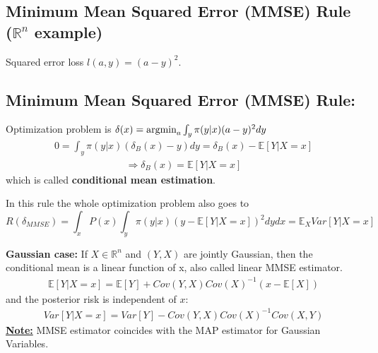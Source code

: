 \documentclass[11pt]{elegantbook}
\newcommand{\argmin}{\operatornamewithlimits{argmin}}
\begin{document}
\subsection{Minimum Mean Squared Error (MMSE) Rule ($\mathbb{R}^n$ example)}
\begin{example}[ (Estimation)]
    Squared error loss $l(a,y)=(a-y)^2$.
\end{example}
\subsection*{Minimum Mean Squared Error (MMSE) Rule:}
Optimization problem is $\delta(x)=\argmin_{a} \int_{y} \pi(y|x) (a-y)^2 dy$
\begin{equation}
    \begin{aligned}
        0=\int_{y} \pi(y|x) (\delta_B(x)-y) dy=\delta_B(x)-\mathbb{E}\left[Y|X=x\right]
    \end{aligned}
    \nonumber
\end{equation}
\begin{equation}
    \begin{aligned}
        \Rightarrow \delta_B(x)=\mathbb{E}\left[Y|X=x\right]
    \end{aligned}
    \nonumber
\end{equation}
which is called \textbf{conditional mean estimation}.

In this rule the whole optimization problem also goes to
$$R(\delta_{MMSE})=\int_x P(x)\int_y \pi(y|x) (y-\mathbb{E}\left[Y|X=x\right])^2 dy dx=\mathbb{E}_X Var\left[Y|X=x\right]$$

\textbf{Gaussian case:}
If $X\in \mathbb{R}^n$ and $(Y,X)$ are jointly Gaussian, then the conditional mean is a linear function of x, also called linear MMSE estimator.
\begin{equation}
    \begin{aligned}
        \mathbb{E}\left[Y|X=x\right]=\mathbb{E}[Y]+Cov(Y,X)Cov(X)^{-1}(x-\mathbb{E}[X])
    \end{aligned}
    \nonumber
\end{equation}
and the posterior risk is independent of $x$:
\begin{equation}
    \begin{aligned}
        Var\left[Y|X=x\right]=Var[Y]-Cov(Y,X)Cov(X)^{-1}Cov(X,Y)
    \end{aligned}
    \nonumber
\end{equation}
\underline{\textbf{Note:}} MMSE estimator coincides with the MAP estimator for Gaussian Variables.
\end{document}
